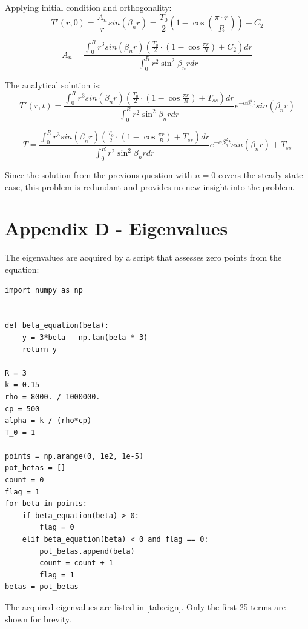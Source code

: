 \documentclass[12pt,letterpaper]{article}
\begin{document}
{{Applying initial condition and orthogonality:
\[T'(r,0) = \frac{A_n}{r} sin(\beta_n r) = \frac{T_0}{2} (1-\cos{(\frac{\pi \cdot r}{R})}) + C_2\]

\[A_n = \frac{\int_{0}^{R}  r^3 sin(\beta_n r) (\frac{T_0}{2} \cdot (1-\cos{\frac{\pi r}{R}}) + C_2) dr} {\int_{0}^{R} r^2 \sin^2{\beta_n r} dr }\]

The analytical solution is:
\[T'(r,t) = \frac{\int_{0}^{R}  r^3 sin(\beta_n r) (\frac{T_0}{2} \cdot (1-\cos{\frac{\pi r}{R}}) + T_{ss}) dr} {\int_{0}^{R} r^2 \sin^2{\beta_n r} dr } e^{-\alpha \beta_n^2 t} sin(\beta_n r)\]

\[T = \frac{\int_{0}^{R}  r^3 sin(\beta_n r) (\frac{T_0}{2} \cdot (1-\cos{\frac{\pi r}{R}}) + T_{ss}) dr} {\int_{0}^{R} r^2 \sin^2{\beta_n r} dr } e^{-\alpha \beta_n^2 t} sin(\beta_n r) + T_{ss} \]

Since the solution from the previous question with $n=0$ covers the 
steady state case, this problem is redundant and provides
no new insight into the problem.

\section*{Appendix D - Eigenvalues}

The eigenvalues are acquired by a script that assesses zero
points from the equation:
\begin{verbatim}
import numpy as np


def beta_equation(beta):
    y = 3*beta - np.tan(beta * 3)
    return y 

R = 3
k = 0.15
rho = 8000. / 1000000.
cp = 500
alpha = k / (rho*cp)
T_0 = 1

points = np.arange(0, 1e2, 1e-5)
pot_betas = []
count = 0
flag = 1
for beta in points:
    if beta_equation(beta) > 0:
        flag = 0
    elif beta_equation(beta) < 0 and flag == 0:
        pot_betas.append(beta)
        count = count + 1
        flag = 1
betas = pot_betas

\end{verbatim}

The acquired eigenvalues are listed in \cref{tab:eign}. Only the first
25 terms are shown for brevity.

}}
\end{document}
